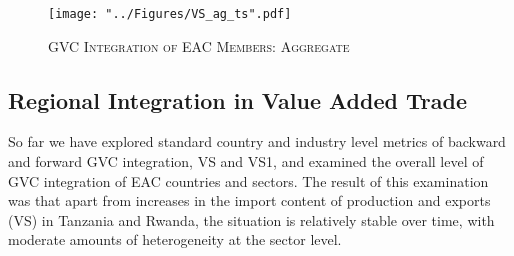 \documentclass[a4paper]{article}
\begin{document}


\begin{figure}[h!]
\centering
\caption{\label{fig:VSag_ts}\textsc{GVC Integration of EAC Members: Aggregate}}
\texttt{[image: "../Figures/VS\_ag\_ts".pdf]} %
\end{figure}
\FloatBarrier







\subsection{Regional Integration in Value Added Trade}

So far we have explored standard country and industry level metrics of backward and forward GVC integration, VS and VS1, and examined the overall level of GVC integration of EAC countries and sectors. The result of this examination was that apart from increases in the import content of production and exports (VS) in Tanzania and Rwanda, the situation is relatively stable over time, with moderate amounts of heterogeneity at the sector level. \newline
\end{document}
